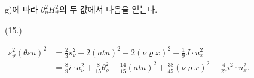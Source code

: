 
g)에 따라 $\theta_\eta^2H_\vartheta^2$의 두 값에서 다음을 얻는다.
\par\smallskip\noindent
\begin{minipage}[c]{3.6em}
\centering (15.)
\end{minipage}%
\begin{minipage}[c]{\dimexpr\linewidth-3.6em\relax}
\centering
\(\displaystyle
\begin{aligned}
s_\vartheta^2(\theta su)^2
&=\frac23s_\nu^2-2(atu)^2+2(\nu\varrho x)^2-\frac19J\cdot u_x^2\\
&=\frac89i\cdot a_\nu^2+\frac8{15}\theta_\varrho^2-\frac{14}{15}(atu)^2+\frac{38}{45}(\nu\varrho x)^2-\frac4{27}i^2\cdot u_x^2.
\end{aligned}
\)
\end{minipage}
\par\smallskip
